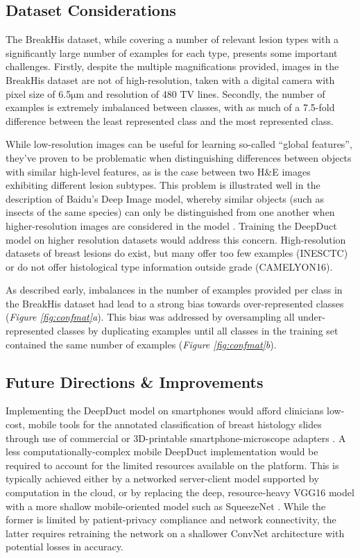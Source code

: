 \subsection{Dataset Considerations}
The BreakHis dataset, while covering a number of relevant lesion types with a significantly large number of examples for each type, presents some important challenges. Firstly, despite the multiple magnifications provided, images in the BreakHis dataset are not of high-resolution, taken with a digital camera with pixel size of 6.5$\mathrm{\mu m}$ and resolution of 480 TV lines. Secondly, the number of examples is extremely imbalanced between classes, with as much of a 7.5-fold difference between the least represented class and the most represented class.\par

While low-resolution images can be useful for learning so-called ``global features'', they've proven to be problematic when distinguishing differences between objects with similar high-level features, as is the case between two H\&E images exhibiting different lesion subtypes. This problem is illustrated well in the description of Baidu's Deep Image model, whereby similar objects (such as insects of the same species) can only be distinguished from one another when higher-resolution images are considered in the model \citep{baidudeepimage}. Training the DeepDuct model on higher resolution datasets would address this concern. High-resolution datasets of breast lesions do exist, but many offer too few examples (INESCTC) or do not offer histological type information outside grade (CAMELYON16).

As described early, imbalances in the number of examples provided per class in the BreakHis dataset had lead to a strong bias towards over-represented classes (\textit{Figure \ref{fig:confmat}a}). This bias was addressed by oversampling all under-represented classes by duplicating examples until all classes in the training set contained the same number of examples (\textit{Figure \ref{fig:confmat}b}).

\subsection{Future Directions \& Improvements}

Implementing the DeepDuct model on smartphones would afford clinicians low-cost, mobile tools for the annotated classification of breast histology slides through use of commercial or 3D-printable smartphone-microscope adapters \citep{cellphone_microscope_platform}. A less computationally-complex mobile DeepDuct implementation would be required to account for the limited resources available on the platform. This is typically achieved either by a networked server-client model supported by computation in the cloud, or by replacing the deep, resource-heavy VGG16 model with a more shallow mobile-oriented model such as SqueezeNet \citep{squeezenet}. While the former is limited by patient-privacy compliance and network connectivity, the latter requires retraining the network on a shallower ConvNet architecture with potential losses in accuracy.

